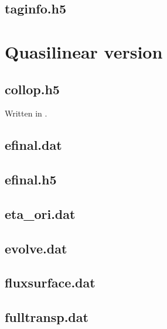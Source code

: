 \subsection{taginfo.h5}

\section{Quasilinear version}

\subsection{collop.h5}
Written in .

\subsection{efinal.dat}

\subsection{efinal.h5}

\subsection{eta\_ori.dat}

\subsection{evolve.dat}

\subsection{fluxsurface.dat}

\subsection{fulltransp.dat}

